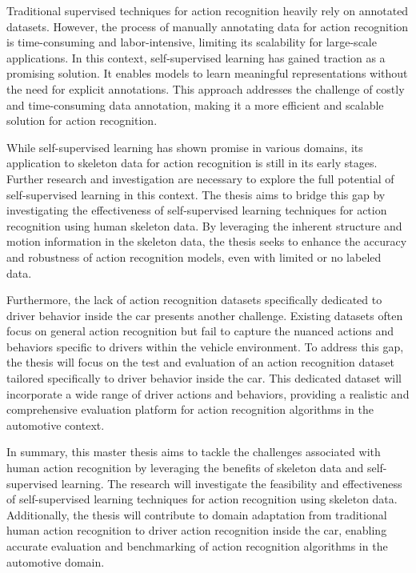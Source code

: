 Traditional supervised techniques for action recognition heavily rely on annotated datasets. However, the process of manually annotating data for action recognition is time-consuming and labor-intensive, limiting its scalability for large-scale applications. In this context, self-supervised learning has gained traction as a promising solution. It enables models to learn meaningful representations without the need for explicit annotations. This approach addresses the challenge of costly and time-consuming data annotation, making it a more efficient and scalable solution for action recognition.

While self-supervised learning has shown promise in various domains, its application to skeleton data for action recognition is still in its early stages. Further research and investigation are necessary to explore the full potential of self-supervised learning in this context. The thesis aims to bridge this gap by investigating the effectiveness of self-supervised learning techniques for action recognition using human skeleton data. By leveraging the inherent structure and motion information in the skeleton data, the thesis seeks to enhance the accuracy and robustness of action recognition models, even with limited or no labeled data.

Furthermore, the lack of action recognition datasets specifically dedicated to driver behavior inside the car presents another challenge. Existing datasets often focus on general action recognition but fail to capture the nuanced actions and behaviors specific to drivers within the vehicle environment. To address this gap, the thesis will focus on the test and evaluation of an action recognition dataset tailored specifically to driver behavior inside the car. This dedicated dataset will incorporate a wide range of driver actions and behaviors, providing a realistic and comprehensive evaluation platform for action recognition algorithms in the automotive context.

In summary, this master thesis aims to tackle the challenges associated with human action recognition by leveraging the benefits of skeleton data and self-supervised learning. The research will investigate the feasibility and effectiveness of self-supervised learning techniques for action recognition using skeleton data. Additionally, the thesis will contribute to domain adaptation from traditional human action recognition to driver action recognition inside the car, enabling accurate evaluation and benchmarking of action recognition algorithms in the automotive domain.

